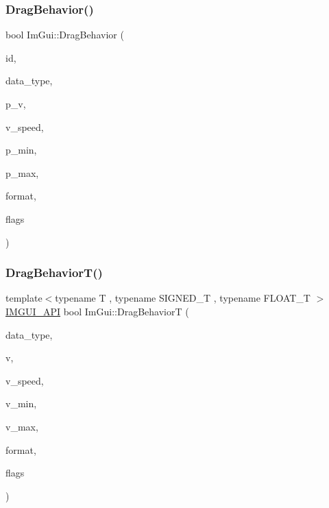 \mbox{\label{namespaceImGui_a03fd8ebf820fd67eccfa0ee037df2d0c}} 
\subsubsection{\texorpdfstring{Drag\+Behavior()}{DragBehavior()}}
{\footnotesize\ttfamily bool Im\+Gui\+::\+Drag\+Behavior (\begin{DoxyParamCaption}\item[{Im\+Gui\+ID}]{id,  }\item[{Im\+Gui\+Data\+Type}]{data\+\_\+type,  }\item[{\hyperlink{imgui__impl__opengl3__loader_8h_ac668e7cffd9e2e9cfee428b9b2f34fa7}{void} $\ast$}]{p\+\_\+v,  }\item[{float}]{v\+\_\+speed,  }\item[{const \hyperlink{imgui__impl__opengl3__loader_8h_ac668e7cffd9e2e9cfee428b9b2f34fa7}{void} $\ast$}]{p\+\_\+min,  }\item[{const \hyperlink{imgui__impl__opengl3__loader_8h_ac668e7cffd9e2e9cfee428b9b2f34fa7}{void} $\ast$}]{p\+\_\+max,  }\item[{const char $\ast$}]{format,  }\item[{Im\+Gui\+Slider\+Flags}]{flags }\end{DoxyParamCaption})}

\mbox{\label{namespaceImGui_aa777ee3801f15acc2f81a131843039ae}} 
\subsubsection{\texorpdfstring{Drag\+Behavior\+T()}{DragBehaviorT()}}
{\footnotesize\ttfamily template$<$typename T , typename S\+I\+G\+N\+E\+D\+\_\+T , typename F\+L\+O\+A\+T\+\_\+T $>$ \\
\hyperlink{imgui_8h_a43829975e84e45d1149597467a14bbf5}{I\+M\+G\+U\+I\+\_\+\+A\+PI} bool Im\+Gui\+::\+Drag\+BehaviorT (\begin{DoxyParamCaption}\item[{Im\+Gui\+Data\+Type}]{data\+\_\+type,  }\item[{T $\ast$}]{v,  }\item[{float}]{v\+\_\+speed,  }\item[{T}]{v\+\_\+min,  }\item[{T}]{v\+\_\+max,  }\item[{const char $\ast$}]{format,  }\item[{Im\+Gui\+Slider\+Flags}]{flags }\end{DoxyParamCaption})}


